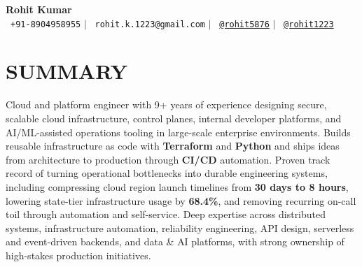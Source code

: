 \documentclass[letterpaper,11pt]{article}
\begin{document}
\begin{center}
    \textbf{\Huge Rohit Kumar} \\ \vspace{5pt}
    \small \faPhone*\ \texttt{+91-8904958955} \hspace{1pt} $|$
    \hspace{1pt} \faEnvelope\ \texttt{rohit.k.1223@gmail.com} \hspace{1pt} $|$
    \hspace{1pt} \faLinkedin\ \href{https://www.linkedin.com/in/rohit5876}{\texttt{@rohit5876}} \hspace{1pt} $|$
    \hspace{1pt} \faGithub\ \href{https://github.com/rohit1223}{\texttt{@rohit1223}} \hspace{1pt} \\ \vspace{-3pt}
\end{center}

\section{SUMMARY}
\begin{itemize}[leftmargin=0in, label={}]
    \small{\item{Cloud and platform engineer with 9+ years of experience designing secure, scalable cloud infrastructure, control planes, internal developer platforms, and AI/ML-assisted operations tooling in large-scale enterprise environments. Builds reusable infrastructure as code with \textbf{Terraform} and \textbf{Python} and ships ideas from architecture to production through \textbf{CI/CD} automation. Proven track record of turning operational bottlenecks into durable engineering systems, including compressing cloud region launch timelines from \textbf{30 days to 8 hours}, lowering state-tier infrastructure usage by \textbf{68.4\%}, and removing recurring on-call toil through automation and self-service. Deep expertise across distributed systems, infrastructure automation, reliability engineering, API design, serverless and event-driven backends, and data \& AI platforms, with strong ownership of high-stakes production initiatives.}}
\end{itemize}

\end{document}
